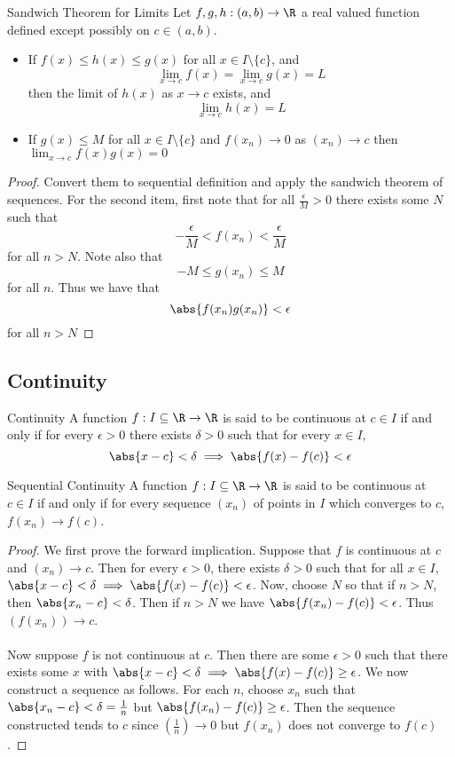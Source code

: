 \begin{thm}{Sandwich Theorem for Limits}{} Let $f,g,h:(a,b)\to\R$ a real valued function defined except possibly on $c\in(a,b)$. 
\begin{itemize}
\item If $f(x)\leq h(x)\leq g(x)$ for all $x\in I\setminus\{c\}$, and $$\lim_{x\to c}f(x)=\lim_{x\to c}g(x)=L$$ then the limit of $h(x)$ as $x\to c$ exists, and $$\lim_{x\to c}h(x)=L$$
\item If $g(x)\leq M$ for all $x\in I\setminus\{c\}$ and $f(x_n)\to0$ as $(x_n)\to c$ then $\lim_{x\to c}f(x)g(x)=0$
\end{itemize} \tcbline
\begin{proof} Convert them to sequential definition and apply the sandwich theorem of sequences. For the second item, first note that for all $\frac{\epsilon}{M}>0$ there exists some $N$ such that $$-\frac{\epsilon}{M}<f(x_n)<\frac{\epsilon}{M}$$ for all $n>N$. Note also that $$-M\leq g(x_n)\leq M$$ for all $n$. Thus we have that $$\abs{f(x_n)g(x_n)}<\epsilon$$ for all $n>N$
\end{proof}
\end{thm}

\subsection{Continuity}
\begin{defn}{Continuity}{} A function $f:I\subseteq\R\to\R$ is said to be continuous at $c\in I$ if and only if for every $\epsilon>0$ there exists $\delta>0$ such that for every $x\in I$, $$\abs{x-c}<\delta\implies\abs{f(x)-f(c)}<\epsilon$$
\end{defn}

\begin{thm}{Sequential Continuity}{} A function $f:I\subseteq\R\to\R$ is said to be continuous at $c\in I$ if and only if for every sequence $(x_n)$ of points in $I$ which converges to $c$, $f(x_n)\to f(c)$. \tcbline
\begin{proof} We first prove the forward implication. Suppose that $f$ is continuous at $c$ and $(x_n)\to c$. Then for every $\epsilon>0$, there exists $\delta>0$ such that for all $x\in I$, $\abs{x-c}<\delta\implies\abs{f(x)-f(c)}<\epsilon$. Now, choose $N$ so that if $n>N$, then $\abs{x_n-c}<\delta$. Then if $n>N$ we have $\abs{f(x_n)-f(c)}<\epsilon$. Thus $\left(f(x_n)\right)\to c$. \\~\\
Now suppose $f$ is not continuous at $c$. Then there are some $\epsilon>0$ such that there exists some $x$ with $\abs{x-c}<\delta\implies\abs{f(x)-f(c)}\geq\epsilon$. We now construct a sequence as follows. For each $n$, choose $x_n$ such that $\abs{x_n-c}<\delta=\frac{1}{n}$ but $\abs{f(x_n)-f(c)}\geq\epsilon$. Then the sequence constructed tends to $c$ since $\left(\frac{1}{n}\right)\to0$ but $f(x_n)$ does not converge to $f(c)$. 
\end{proof}
\end{thm}

